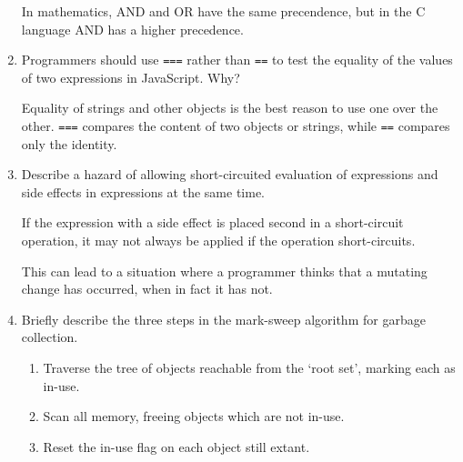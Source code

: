 \begin{enumerate}
\begin{answer}
    In mathematics, AND and OR have the same precendence, but in the C language
    AND has a higher precedence.

    \end{answer}

  \item Programmers should use \verb+===+ rather than \verb+==+ to
    test the equality of the values of two expressions in JavaScript. Why?

  \begin{answer}

    Equality of strings and other objects is the best reason to use one over the
    other. \verb+===+ compares the content of two objects or strings,
    while \verb+==+ compares only the identity.

    \end{answer}

  \item Describe a hazard of allowing short-circuited evaluation
    of expressions and side effects in expressions at the same time.

  \begin{answer}

    If the expression with a side effect is placed second in a short-circuit
    operation, it may not always be applied if the operation short-circuits.

    This can lead to a situation where a programmer thinks that a mutating
    change has occurred, when in fact it has not.

    \end{answer}

  \item Briefly describe the three steps in the mark-sweep algorithm
    for garbage collection.

  \begin{answer}

    \begin{enumerate}
      \item Traverse the tree of objects reachable from the `root set', marking
        each as in-use.
      \item Scan all memory, freeing objects which are not in-use.
      \item Reset the in-use flag on each object still extant.

      \end{enumerate}

    \end{answer}


\end{enumerate}
